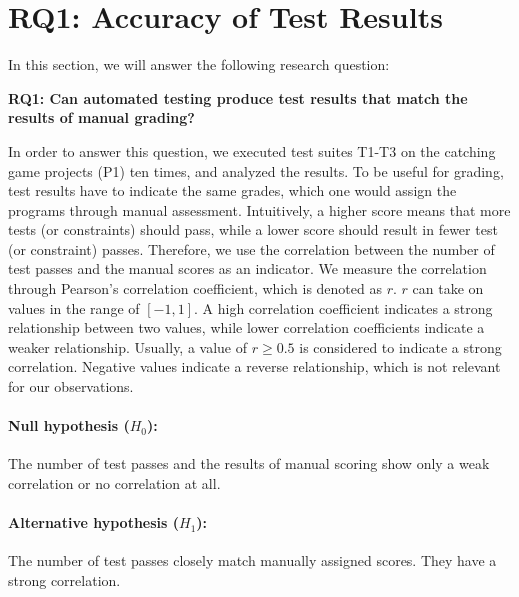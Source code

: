 \section{RQ1: Accuracy of Test Results}
\label{sec:rq1}

In this section, we will answer the following research question:

\begin{center}\begin{minipage}{.9\textwidth}
    \textbf{RQ1: Can automated testing produce test results that match the results of manual grading?}
\end{minipage}\end{center}

\noindent In order to answer this question,
we executed test suites T1-T3 on the catching game projects (P1) ten times,
and analyzed the results.
To be useful for grading,
test results have to indicate the same grades,
which one would assign the programs through manual assessment.
Intuitively, a higher score means that more tests (or constraints) should pass,
while a lower score should result in fewer test (or constraint) passes.
Therefore, we use the correlation between the number of test passes and the manual scores as an indicator.
We measure the correlation through Pearson's correlation coefficient, which is denoted as $r$.
$r$ can take on values in the range of $[-1, 1]$.
A high correlation coefficient indicates a strong relationship between two values,
while lower correlation coefficients indicate a weaker relationship.
Usually, a value of $r \ge 0.5$ is considered to indicate a strong correlation.
Negative values indicate a reverse relationship, which is not relevant for our observations.

\paragraph{Null hypothesis ($H_0$):}
The number of test passes and the results of manual scoring show only a weak correlation or no correlation at all.
\vspace{-\medskipamount}
\paragraph{Alternative hypothesis ($H_1$):}
The number of test passes closely match manually assigned scores.
They have a strong correlation.

